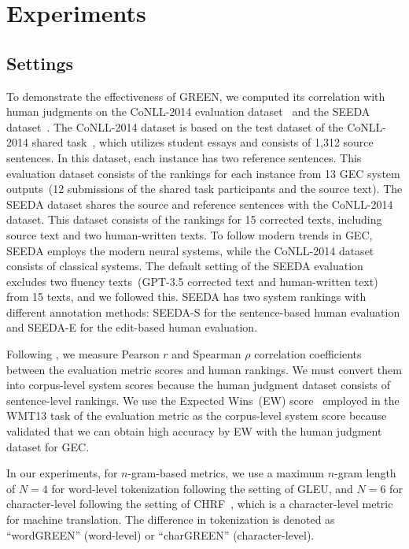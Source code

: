 \documentclass[11pt]{article}
\begin{document}
\section{Experiments}
\label{sec:experiment}

\subsection{Settings}
\label{sec:settings}

To demonstrate the effectiveness of GREEN, we computed its correlation with human judgments on the CoNLL-2014 evaluation dataset~\citep{grundkiewicz-etal-2015-human} and the SEEDA dataset~\citep{10.1162/tacl_a_00676}.
The CoNLL-2014 dataset is based on the test dataset of the CoNLL-2014 shared task~\citep{ng-etal-2014-conll}, which utilizes student essays and consists of 1,312 source sentences.
In this dataset, each instance has two reference sentences.
This evaluation dataset consists of the rankings for each instance from 13 GEC system outputs~(12 submissions of the shared task participants and the source text).
The SEEDA dataset shares the source and reference sentences with the CoNLL-2014 dataset.
This dataset consists of the rankings for 15 corrected texts, including source text and two human-written texts.
To follow modern trends in GEC, SEEDA employs the modern neural systems, while the CoNLL-2014 dataset consists of classical systems.
The default setting of the SEEDA evaluation excludes two fluency texts~(GPT-3.5 corrected text and human-written text) from 15 texts, and we followed this.
SEEDA has two system rankings with different annotation methods: SEEDA-S for the sentence-based human evaluation and SEEDA-E for the edit-based human evaluation.

Following \citet{grundkiewicz-etal-2015-human}, we measure Pearson $r$ and Spearman $\rho$ correlation coefficients between the evaluation metric scores and human rankings.
We must convert them into corpus-level system scores because the human judgment dataset consists of sentence-level rankings.
We use the Expected Wins~(EW) score~\citep{bojar-etal-2013-findings} employed in the WMT13 task of the evaluation metric as the corpus-level system score because \citet{grundkiewicz-etal-2015-human} validated that we can obtain high accuracy by EW with the human judgment dataset for GEC.

In our experiments, for $n$-gram-based metrics, we use a maximum $n$-gram length of $N=4$ for word-level tokenization following the setting of GLEU, and $N=6$ for character-level following the setting of CHRF~\citep{popovic-2015-chrf}, which is a character-level metric for machine translation.
The difference in tokenization is denoted as ``wordGREEN'' (word-level) or ``charGREEN'' (character-level).
\end{document}
